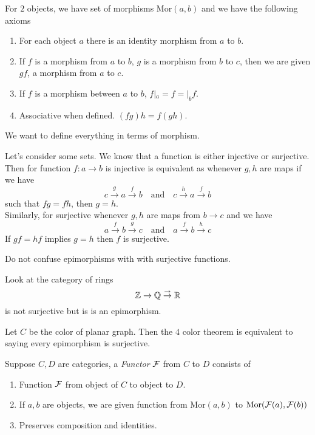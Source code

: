 \begin{definition}
	For $2$ objects, we have set of morphisms $\mathrm{Mor}(a,b)$ and we have the following axioms
	\begin{enumerate}
		\item For each object $a$ there is an identity morphism from $a$ to $b$.
		\item If $f$ is a morphism from $a$ to $b$, $g$ is a morphism from $b$ to $c$, then we are given $gf$, a morphism from $a$ to $c$.
		\item If $f$ is a morphism between $a$ to $b$, $f|_a = f = |_bf$.
		\item Associative when defined. $(fg)h = f(gh)$.
	\end{enumerate}
\end{definition}
\begin{example}
	We want to define everything in terms of morphism. 

	Let's consider some sets. We know that a function is either injective or surjective. Then for function $f : a \to b$ is injective is equivalent as whenever $g,h$ are maps if we have
	\[ c \stackrel{g}{\to} a \stackrel{f}{\to} b \quad \mathrm{and} \quad c \stackrel{h}{\to} a \stackrel{f}{\to} b\]
	such that $fg = fh$, then $g = h$. \\
	Similarly, for surjective whenever $g,h$ are maps from $b \to c$ and we have
	\[ a \stackrel{f}{\to} b \stackrel{g}{\to} c \quad \mathrm{and} \quad a \stackrel{f}{\to} b \stackrel{h}{\to} c\]
	If $gf = hf$ implies $g = h$ then $f$ is surjective.
\end{example}
\begin{remark}
	Do not confuse epimorphisms with with surjective functions.
\end{remark}
\begin{example}
	Look at the category of rings
	\[ \mathbb Z \to \mathbb Q \stackrel \to \to \mathbb R\]
	 is not surjective but is is an epimorphism.
\end{example}
\begin{example}
	Let $C$ be the color of planar graph. Then the $4$ color theorem is equivalent to saying every epimorphism is surjective.
\end{example}
\begin{definition}
	Suppose $C,D$ are categories, a \textit{Functor} $\mathcal F$ from $C$ to $D$ consists of 
	\begin{enumerate}
		\item Function $\mathcal F$ from object of $C$ to object to $D$.
		\item If $a,b$ are objects, we are given function from $\mathrm{Mor}(a,b)$ to $\mathrm{Mor}(\mathcal F(a),\mathcal F(b))$
		\item Preserves composition and identities.
	\end{enumerate}
\end{definition}
